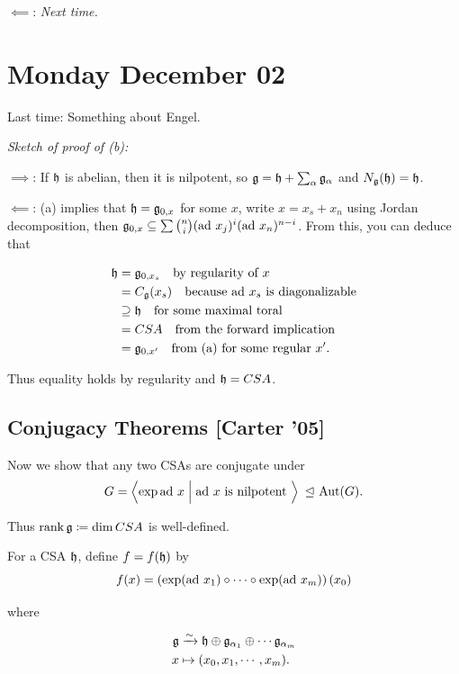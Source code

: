 \(\impliedby\): \emph{Next time.}

\hypertarget{monday-december-02}{%
\section{Monday December 02}\label{monday-december-02}}

Last time: Something about Engel.

\emph{Sketch of proof of (b):}

\(\implies\): If \({\mathfrak{h}}\) is abelian, then it is nilpotent, so
\({\mathfrak{g}} = {\mathfrak{h}} + \sum_\alpha {\mathfrak{g}}_\alpha\) and
\(N_{\mathfrak{g}}({\mathfrak{h}}) = {\mathfrak{h}}\).

\(\impliedby\): (a) implies that \({\mathfrak{h}} = {\mathfrak{g}}_{0, x}\) for some
\(x\), write \(x = x_s + x_n\) using Jordan decomposition, then
\({\mathfrak{g}}_{0, x} \subseteq \sum {n\choose i} (\mathrm{ad}~ x_j)^i (\mathrm{ad}~ x_n)^{n-i}\).
From this, you can deduce that

\begin{align*}
{\mathfrak{h}} 
&= {\mathfrak{g}}_{0, x_s} \quad\text{by regularity of $x$} \\
&= C_{\mathfrak{g}}(x_s) \quad\text{because $\mathrm{ad}~ x_s$ is diagonalizable} \\
&\supseteq {\mathfrak{h}} \quad\text{for some maximal toral} \\
&= CSA \quad\text{from the forward implication} \\
&= {\mathfrak{g}}_{0, x'} \quad\text{from (a) for some regular $x'$}
.\end{align*}

Thus equality holds by regularity and \({\mathfrak{h}} = CSA\).

\hypertarget{conjugacy-theorems-carter-05}{%
\subsection{Conjugacy Theorems {[}Carter
'05{]}}\label{conjugacy-theorems-carter-05}}

Now we show that any two CSAs are conjugate under \[
G = \left\langle{\exp \mathrm{ad}~x \mathrel{\Big|}\mathrm{ad}~x \text{ is nilpotent }}\right\rangle {~\trianglelefteq~} {\text{Aut}}(G).
\]

Thus \(\operatorname{rank} {\mathfrak{g}} \coloneqq \dim CSA\) is well-defined.

For a CSA \({\mathfrak{h}}\), define \(f = f({\mathfrak{h}})\) by \[
f(x) = \left( \exp(\mathrm{ad}~ x_1) \circ \cdots \circ \exp(\mathrm{ad}~ x_m) \right)(x_0)
\]

where

\begin{align*}
{\mathfrak{g}} &\xrightarrow{\sim} {\mathfrak{h}} \oplus {\mathfrak{g}}_{\alpha_1} \oplus \cdots {\mathfrak{g}}_{\alpha_m} \\
x &\mapsto (x_0, x_1, \cdots, x_m)
.\end{align*}

